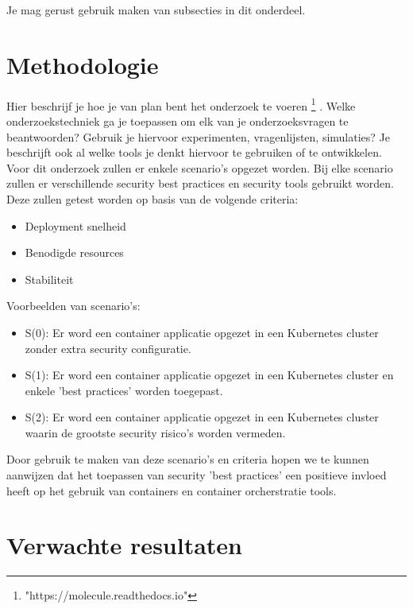 Je mag gerust gebruik maken van subsecties in dit onderdeel.

\section{Methodologie}
\label{sec:methodologie}

Hier beschrijf je hoe je van plan bent het onderzoek te voeren \footnote{"https://molecule.readthedocs.io"} \autocite{Gartner2019}. 
Welke onderzoekstechniek ga je toepassen om elk van je onderzoeksvragen te beantwoorden? Gebruik je hiervoor experimenten, vragenlijsten,
 simulaties? Je beschrijft ook al welke tools je denkt hiervoor te gebruiken of te ontwikkelen.
Voor dit onderzoek zullen er enkele scenario's opgezet worden. Bij elke scenario zullen er verschillende security best practices en security tools gebruikt worden.
Deze zullen getest worden op basis van de volgende criteria: \newline
\begin{itemize}
	\item Deployment snelheid
	\item Benodigde resources
	\item Stabiliteit \newline
\end{itemize} 
Voorbeelden van scenario's: \newline
\begin{itemize}
	\item S(0): Er word een container applicatie opgezet in een Kubernetes cluster zonder extra security configuratie.
	\item S(1): Er word een container applicatie opgezet in een Kubernetes cluster en enkele 'best practices' worden toegepast.
	\item S(2): Er word een container applicatie opgezet in een Kubernetes cluster waarin de grootste security risico's worden vermeden. \newline
\end{itemize} 
Door gebruik te maken van deze scenario's en criteria hopen we te kunnen aanwijzen dat het toepassen van security 'best practices' een positieve invloed heeft op het gebruik van containers en container orcherstratie tools.
\section{Verwachte resultaten}
\label{sec:verwachte_resultaten}

